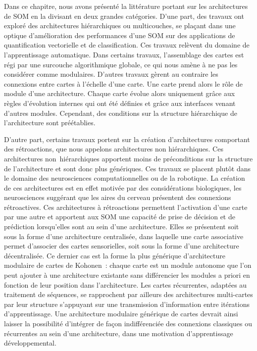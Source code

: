 \documentclass[../main]{subfiles}
\begin{document}
Dans ce chapitre, nous avons présenté la littérature portant sur les architectures de SOM en la divisant en deux grandes catégories. 
D'une part, des travaux ont exploré des architectures hiérarchiques ou multicouches, se plaçant dans une optique d'amélioration des performances d'une SOM sur des applications de quantification vectorielle et de classification. Ces travaux relèvent du domaine de l'apprentissage automatique. 
Dans certains travaux, l'assemblage des cartes est régi par une surcouche algorithmique globale, ce qui nous amène à ne pas les considérer comme modulaires. 
D'autres travaux gèrent au contraire les connexions entre cartes à l'échelle d'une carte. Une carte prend alors le rôle de module d'une architecture. Chaque carte évolue alors uniquement grâce aux règles d'évolution internes qui ont été définies et grâce aux interfaces venant d'autres modules. Cependant, des conditions sur la structure hiérarchique de l'architecture sont préétablies.

D'autre part, certains travaux portent sur la création d'architectures comportant des rétroactions, que nous appelons architectures non hiérarchiques. Ces architectures non~hiérarchiques apportent moins de préconditions sur la structure de l'architecture et sont donc plus génériques.
Ces travaux se placent plutôt dans le domaine des neurosciences computationnelles ou de la robotique. La création de ces architectures est en effet motivée par des considérations biologiques, les neurosciences suggérant que les aires du cerveau présentent des connexions rétroactives. 
Ces architectures à rétroactions permettent l'activation d'une carte par une autre et apportent aux SOM une capacité de prise de décision et de prédiction lorsqu'elles sont au sein d'une architecture. 
Elles se présentent soit sous la forme d'une architecture centralisée, dans laquelle une carte associative permet d'associer des cartes sensorielles, soit sous la forme d'une architecture décentralisée. 
Ce dernier cas est la forme la plus générique d'architecture modulaire de cartes de Kohonen~: chaque carte est un module autonome que l'on peut ajouter à une architecture existante sans différencier les modules a priori en fonction de leur position dans l'architecture.
Les cartes récurrentes, adaptées au traitement de séquences, se rapprochent par ailleurs des architectures multi-cartes par leur structure s'appuyant sur une transmission d'information entre itérations d'apprentissage.
Une architecture modulaire générique de cartes devrait ainsi laisser la possibilité d'intégrer de façon indifférenciée des connexions classiques ou récurrentes au sein d'une architecture, dans une motivation d'apprentissage développemental.
\end{document}

